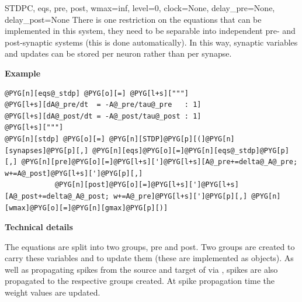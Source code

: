 \documentclass[letterpaper,10pt,english]{manual}
\begin{document}
\begin{classdesc}{STDP}{C, eqs, pre, post, wmax=inf, level=0, clock=None, delay\_pre=None, delay\_post=None}
There is one restriction on the equations that can be implemented in this
system, they need to be separable into independent pre- and post-synaptic
systems (this is done automatically). In this way, synaptic variables and
updates can be stored per neuron rather than per synapse.

\textbf{Example}

\begin{Verbatim}[commandchars=@\[\]]
@PYG[n][eqs@_stdp] @PYG[o][=] @PYG[l+s]["""]
@PYG[l+s][dA@_pre/dt  = -A@_pre/tau@_pre   : 1]
@PYG[l+s][dA@_post/dt = -A@_post/tau@_post : 1]
@PYG[l+s]["""]
@PYG[n][stdp] @PYG[o][=] @PYG[n][STDP]@PYG[p][(]@PYG[n][synapses]@PYG[p][,] @PYG[n][eqs]@PYG[o][=]@PYG[n][eqs@_stdp]@PYG[p][,] @PYG[n][pre]@PYG[o][=]@PYG[l+s][']@PYG[l+s][A@_pre+=delta@_A@_pre; w+=A@_post]@PYG[l+s][']@PYG[p][,]
            @PYG[n][post]@PYG[o][=]@PYG[l+s][']@PYG[l+s][A@_post+=delta@_A@_post; w+=A@_pre]@PYG[l+s][']@PYG[p][,] @PYG[n][wmax]@PYG[o][=]@PYG[n][gmax]@PYG[p][)]
\end{Verbatim}

\textbf{Technical details}

The equations are split into two groups, pre and post. Two groups are created
to carry these variables and to update them (these are implemented as
\hyperlink{brian.NeuronGroup}{} objects). As well as propagating spikes from the source
and target of  via , spikes are also propagated to the respective
groups created. At spike propagation time the weight values are updated.
\end{classdesc}
\end{document}
